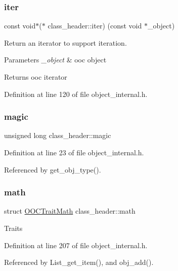 \subsubsection{\texorpdfstring{iter}{iter}}
{\footnotesize\ttfamily const void$\ast$($\ast$ class\+\_\+header\+::iter) (const void $\ast$\+\_\+object)}

Return an iterator to support iteration. 
\begin{DoxyParams}{Parameters}
{\em \+\_\+object} & ooc object \\
\hline
\end{DoxyParams}
\begin{DoxyReturn}{Returns}
ooc iterator 
\end{DoxyReturn}


Definition at line 120 of file object\+\_\+internal.\+h.

\mbox{\label{structclass__header_aa98964036010ad63554856c5f4680cec}} 
\subsubsection{\texorpdfstring{magic}{magic}}
{\footnotesize\ttfamily unsigned long class\+\_\+header\+::magic}



Definition at line 23 of file object\+\_\+internal.\+h.



Referenced by get\+\_\+obj\+\_\+type().

\mbox{\label{structclass__header_a119175910ca4b52e4671f04616dcd2f6}} 
\subsubsection{\texorpdfstring{math}{math}}
{\footnotesize\ttfamily struct \mbox{\hyperlink{structOOCTraitMath}{O\+O\+C\+Trait\+Math}} class\+\_\+header\+::math}

Traits 

Definition at line 207 of file object\+\_\+internal.\+h.



Referenced by List\+\_\+get\+\_\+item(), and obj\+\_\+add().

